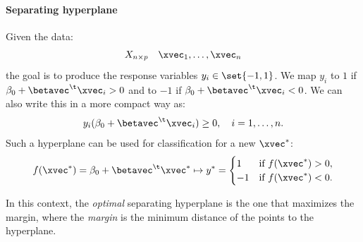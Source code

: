 \paragraph{Separating hyperplane}

Given the data:
\begin{equation}
    X_{n \times p}\quad\xvec_1, \ldots, \xvec_n
\end{equation}
the goal is to produce the response variables $y_i \in \set{-1,1}$. We map $y_i$ to $1$ if $\beta_0 + \betavec^\t\xvec_i > 0$ and to $-1$ if $\beta_0 + \betavec^\t\xvec_i < 0$. We can also write this in a more compact way as:
\begin{equation}
    y_i(\beta_0 + \betavec^\t\xvec_i) \geq 0, \quad i = 1, \ldots, n.
\end{equation}
Such a hyperplane can be used for classification for a new $\xvec^*$:
\begin{equation}
    f(\xvec^*) = \beta_0 + \betavec^\t\xvec^* \mapsto y^* = \begin{cases}
        1  & \text{if } f(\xvec^*) > 0, \\
        -1 & \text{if } f(\xvec^*) < 0.
    \end{cases}
\end{equation}

In this context, the \emph{optimal} separating hyperplane is the one that maximizes the margin, where the \emph{margin} is the minimum distance of the points to the hyperplane.

